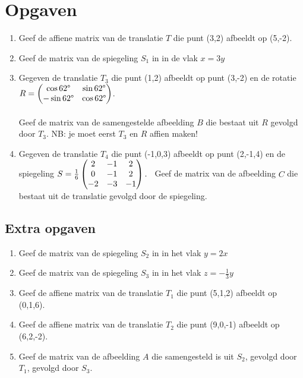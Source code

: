 \newpage
\section{Opgaven}
\begin{enumerate}
	\item Geef de affiene matrix van de translatie $ T $  die punt (3,2) afbeeldt op (5,-2).	\\   
	
	\item Geef de matrix van de spiegeling  $ S_1$ in \RD in de vlak $ x = 3 y $ \\
	
	\item Gegeven de translatie $ T_{3} $ die punt (1,2) afbeeldt op punt (3,-2) en de rotatie \\
	$ R  =  \begin{pmatrix}   \cos 62\degree & \sin 62\degree \\  -\sin 62\degree & \cos 62\degree \end{pmatrix} $. \ \\ \\
	Geef de matrix van de samengestelde afbeelding $B$ die bestaat uit $R$ gevolgd door $ T_{3} $. NB: je moet eerst $ T_{3} $ en $R$ affien maken! \\
	
	\item Gegeven de translatie $ T_{4} $  die punt (-1,0,3) afbeeldt op punt (2,-1,4) en de spiegeling 
	$ S = \frac{1}{6} \begin{pmatrix}  2& -1 &  2 \\  0& -1 & 2 \\  -2 & -3 & -1 \end{pmatrix}. $  \ 
	Geef de matrix van de afbeelding $C$ die bestaat uit de translatie gevolgd door de spiegeling.
\end{enumerate} 
\vspace{2cm}

\subsection{Extra opgaven}
\begin{enumerate}
	\item Geef de matrix van de spiegeling $ S_2 $  in \RD in het vlak $ y= 2x $ \\
	
	\item Geef de matrix van de spiegeling $ S_3 $  in \RD in het vlak $ z= -\frac{1}{3}y $ \\
	
	\item Geef de affiene matrix van de translatie $ T_{1} $ die punt (5,1,2) afbeeldt op (0,1,6). \\
	
	\item Geef de affiene matrix van de translatie $ T_{2} $ die punt (9,0,-1) afbeeldt op (6,2,-2). \\
	
	\item Geef de matrix van de afbeelding $A$ die samengesteld is uit $ S_2 $, gevolgd door $ T_1 $, gevolgd door $ S_3 $.  
\end{enumerate}

